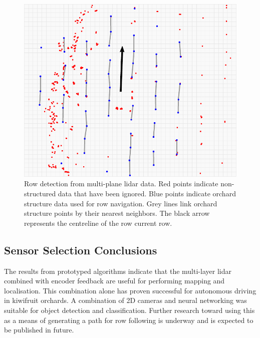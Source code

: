 \documentclass[preprint,authoryear,12pt]{elsarticle}
\begin{document}
        \begin{figure}[htb]
            \centering
            \includegraphics[width=\linewidth]{imgs/row_following/row_following_narrow.pdf}
            \caption{
                Row detection from multi-plane lidar data.
                Red points indicate non-structured data that have been ignored.
                Blue points indicate orchard structure data used for row navigation.
                Grey lines link orchard structure points by their nearest neighbors.
                The black arrow represents the centreline of the row current row.
            }
            \label{fig:lastLidarFrame}
        \end{figure}

\subsection{Sensor Selection Conclusions}
    The results from prototyped algorithms indicate that the multi-layer lidar combined with encoder feedback are useful for performing mapping and localisation.
    This combination alone has proven successful for autonomous driving in kiwifruit orchards.
    A combination of 2D cameras and neural networking was suitable for object detection and classification.
    Further research toward using this as a means of generating a path for row following is underway and is expected to be published in future.

\end{document}
